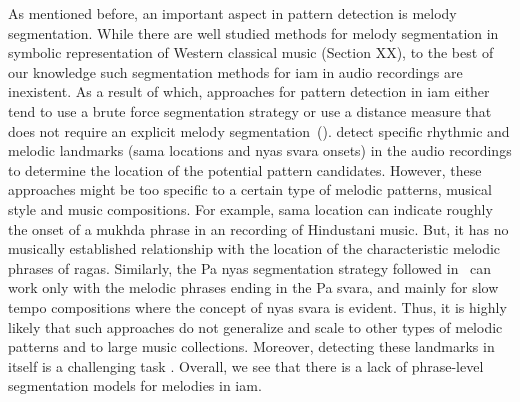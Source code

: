 {As mentioned before, an important aspect in pattern detection is melody segmentation. While there are well studied methods for melody segmentation in symbolic representation of Western classical music (Section XX), to the best of our knowledge such segmentation methods for \gls{iam} in audio recordings are inexistent. As a result of which, approaches for pattern detection in \gls{iam} either tend to use a brute force segmentation strategy or use a distance measure that does not require an explicit melody segmentation~(). \cite{Ross2012,Ross2012b} detect specific rhythmic and melodic landmarks (\gls{sama} locations and \gls{nyas} \gls{svara} onsets) in the audio recordings to determine the location of the potential pattern candidates. However, these approaches might be too specific to a certain type of melodic patterns, musical style and music compositions. For example, \gls{sama} location can indicate roughly the onset of a \gls{mukhda} phrase in an recording of Hindustani music. But, it has no musically established relationship with the location of the characteristic melodic phrases of \glspl{raga}. Similarly, the Pa \gls{nyas} segmentation strategy followed in~\cite{Ross2012} can work only with the melodic phrases ending in the Pa \gls{svara}, and mainly for slow tempo compositions where the concept of \gls{nyas} \gls{svara} is evident. Thus, it is highly likely that such approaches do not generalize and scale to other types of melodic patterns and to large music collections. Moreover, detecting these landmarks in itself is a challenging task . Overall, we see that there is a lack of phrase-level segmentation models for melodies in \gls{iam}.

}
